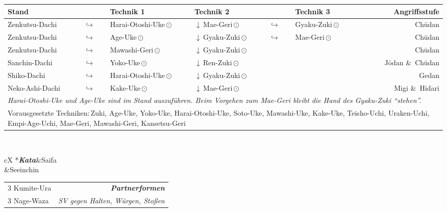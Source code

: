 	\null\vfill\null
	\begin{tabularx}{\textwidth}{lllllXr}
		\textbf{Stand} 	&  	& \textbf{Technik 1} & \textbf{Technik 2} & &\textbf{Technik 3}& \textbf{Angriffsstufe}\\
		\midrule
		Zenkutsu-Dachi 	& \(\hookrightarrow\)	& Harai-Otoshi-Uke\,\(\odot\) 	& \(\downarrow\)\,Mae-Geri\,\(\odot\)	& \(\hookrightarrow\) 	& Gyaku-Zuki\,\(\odot\)	& Ch\={u}dan \\
		Zenkutsu-Dachi 	& \(\hookrightarrow\)	& Age-Uke\,\(\odot\) 			& \(\downarrow\)\,Gyaku-Zuki\,\(\odot\) & \(\hookrightarrow\)	& Mae-Geri\,\(\odot\)	& Ch\={u}dan \\
		Zenkutsu-Dachi 	& \(\hookrightarrow\)	& Mawashi-Geri\,\(\odot\) 		& \(\downarrow\)\,Gyaku-Zuki\,\(\odot\) 				&						&	 					& Ch\={u}dan \\
		Sanchin-Dachi 	& \(\hookrightarrow\)	& Yoko-Uke\,\(\odot\) 			& \(\downarrow\)\,Ren-Zuki\,\(\odot\) 					&						& 						& J\={o}dan \&~Ch\={u}dan \\
		Shiko-Dachi 	& \(\hookrightarrow\)	& Harai-Otoshi-Uke\,\(\odot\) 	& \(\downarrow\)\,Gyaku-Zuki\,\(\odot\) 				&						& 						& Gedan \\
		Neko-Ashi-Dachi	& \(\hookrightarrow\)	& Kake-Uke\,\(\odot\) 			& \(\downarrow\)\,Mae-Geri\,\(\odot\) 					&						& 						& Migi \&~Hidari  \\
		\multicolumn{7}{l}{{\scriptsize \textit{Harai-Otoshi-Uke und Age-Uke sind im Stand auszuführen. Beim Vorgehen zum Mae-Geri bleibt die Hand des Gyaku-Zuki \textquotedblleft{stehen}\textquotedblright .}}}\\
		\midrule
		\multicolumn{7}{p{\linewidth-2\tabcolsep}}{{\footnotesize Vorausgesetzte Techniken:\,Zuki, Age-Uke, Yoko-Uke, Harai-Otoshi-Uke, Soto-Uke, Mawashi-Uke, Kake-Uke, Teisho-Uchi, Uraken-Uchi, Empi-Age-Uchi, Mae-Geri, Mawashi-Geri, Kansetsu-Geri}}\\
		\midrule
	\end{tabularx}\\
	\null\vfill\null
	\begin{minipage}[t]{0.45\textwidth}
		\begin{tabularx}{\textwidth}{cX}
			\midrule
			*{\textbf{\textit{Kata}}}&Saifa\\
			&Seeinchin \\
			\midrule
		\end{tabularx}
	\end{minipage}
	\null\hfill\null	%
	\begin{minipage}[t]{0.45\textwidth}
		\begin{tabularx}{\textwidth}{Xr}
			\midrule
			3 Kumite-Ura	&{\textbf{\textit{Partnerformen}}}\\
			3 Nage-Waza		&{\small \textit{SV gegen Halten, Würgen, Stoßen}} \\
			\midrule
		\end{tabularx}
	\end{minipage}\\
